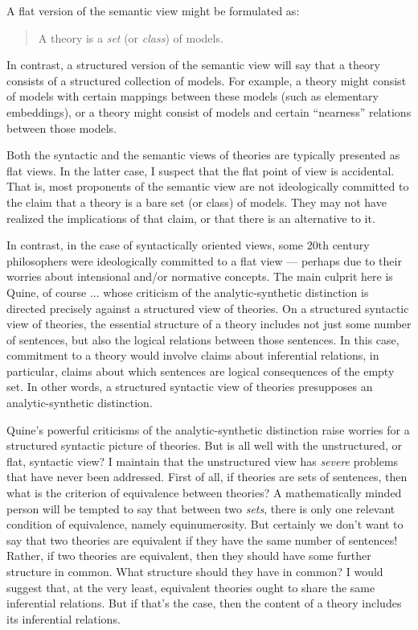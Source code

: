 A flat version of the semantic view might be formulated as:
\begin{quote} A theory is a {\it set} (or {\it class}) of
  models. \end{quote} In contrast, a structured version of the
semantic view will say that a theory consists of a structured
collection of models.  For example, a theory might consist of models
with certain mappings between these models (such as elementary
embeddings), or a theory might consist of models and certain
``nearness'' relations between those models.

Both the syntactic and the semantic views of theories are typically
presented as flat views.  In the latter case, I suspect that the flat
point of view is accidental.  That is, most proponents of the semantic
view are not ideologically committed to the claim that a theory is a
bare set (or class) of models.  They may not have realized the
implications of that claim, or that there is an alternative to it.

In contrast, in the case of syntactically oriented views, some 20th
century philosophers were ideologically committed to a flat view ---
perhaps due to their worries about intensional and/or normative
concepts.  The main culprit here is Quine, of course ...  whose
criticism of the analytic-synthetic distinction is directed precisely
against a structured view of theories.  On a structured syntactic view
of theories, the essential structure of a theory includes not just
some number of sentences, but also the logical relations between those
sentences.  In this case, commitment to a theory would involve claims
about inferential relations, in particular, claims about which
sentences are logical consequences of the empty set.  In other words,
a structured syntactic view of theories presupposes an
analytic-synthetic distinction.

Quine's powerful criticisms of the analytic-synthetic distinction
raise worries for a structured syntactic picture of theories.  But is
all well with the unstructured, or flat, syntactic view?  I maintain
that the unstructured view has {\it severe} problems that have never
been addressed.  First of all, if theories are sets of sentences, then
what is the criterion of equivalence between theories?  A
mathematically minded person will be tempted to say that between two
{\it sets}, there is only one relevant condition of equivalence,
namely equinumerosity.  But certainly we don't want to say that two
theories are equivalent if they have the same number of sentences!
Rather, if two theories are equivalent, then they should have some
further structure in common.  What structure should they have in
common?  I would suggest that, at the very least, equivalent theories
ought to share the same inferential relations.  But if that's the
case, then the content of a theory includes its inferential relations.



